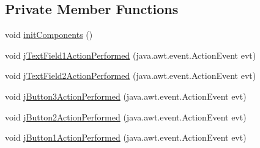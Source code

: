\subsection*{Private Member Functions}
\begin{DoxyCompactItemize}
\item 
void \mbox{\hyperlink{classactualizadordoxy_1_1ventana_principal_af0eb6bf60de2f8adbaac5a458428e2fe}{init\+Components}} ()
\item 
void \mbox{\hyperlink{classactualizadordoxy_1_1ventana_principal_a07a6f5c9a19788d19f2e92d3d4ae9942}{j\+Text\+Field1\+Action\+Performed}} (java.\+awt.\+event.\+Action\+Event evt)
\item 
void \mbox{\hyperlink{classactualizadordoxy_1_1ventana_principal_a1a0fec6296ff00cf7f39be7a58e37e3c}{j\+Text\+Field2\+Action\+Performed}} (java.\+awt.\+event.\+Action\+Event evt)
\item 
void \mbox{\hyperlink{classactualizadordoxy_1_1ventana_principal_a714f4ea7e27667dfa242c579a2fdf6f1}{j\+Button3\+Action\+Performed}} (java.\+awt.\+event.\+Action\+Event evt)
\item 
void \mbox{\hyperlink{classactualizadordoxy_1_1ventana_principal_ad80963b7f354d80ffa69e7e6cadba390}{j\+Button2\+Action\+Performed}} (java.\+awt.\+event.\+Action\+Event evt)
\item 
void \mbox{\hyperlink{classactualizadordoxy_1_1ventana_principal_aa309a47bf4e80a45c18c516ec13f8c64}{j\+Button1\+Action\+Performed}} (java.\+awt.\+event.\+Action\+Event evt)
\end{DoxyCompactItemize}
